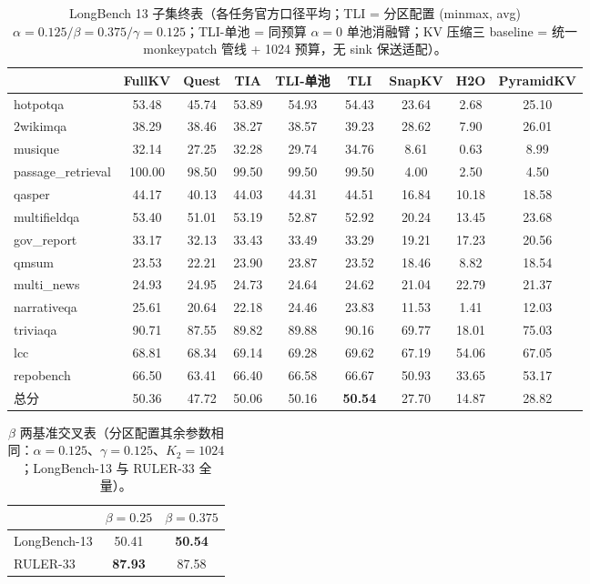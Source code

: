 \documentclass[11pt]{article}
\begin{document}
\begin{table}[h]\centering
\small
\caption{LongBench 13 子集终表（各任务官方口径平均；TLI = 分区配置 (minmax, avg) $\alpha{=}0.125/\beta{=}0.375/\gamma{=}0.125$；TLI-单池 = 同预算 $\alpha{=}0$ 单池消融臂；KV 压缩三 baseline = 统一 monkeypatch 管线 + 1024 预算，无 sink 保送适配）。}
\label{tab:longbench}
\begin{tabular}{lcccccccc}
\toprule
 & FullKV & Quest & TIA & TLI-单池 & TLI & SnapKV & H2O & PyramidKV \\

\midrule
hotpotqa & 53.48 & 45.74 & 53.89 & 54.93 & 54.43 & 23.64 & 2.68 & 25.10 \\
2wikimqa & 38.29 & 38.46 & 38.27 & 38.57 & 39.23 & 28.62 & 7.90 & 26.01 \\
musique & 32.14 & 27.25 & 32.28 & 29.74 & 34.76 & 8.61 & 0.63 & 8.99 \\
passage\_retrieval & 100.00 & 98.50 & 99.50 & 99.50 & 99.50 & 4.00 & 2.50 & 4.50 \\
qasper & 44.17 & 40.13 & 44.03 & 44.31 & 44.51 & 16.84 & 10.18 & 18.58 \\
multifieldqa & 53.40 & 51.01 & 53.19 & 52.87 & 52.92 & 20.24 & 13.45 & 23.68 \\
gov\_report & 33.17 & 32.13 & 33.43 & 33.49 & 33.29 & 19.21 & 17.23 & 20.56 \\
qmsum & 23.53 & 22.21 & 23.90 & 23.87 & 23.52 & 18.46 & 8.82 & 18.54 \\
multi\_news & 24.93 & 24.95 & 24.73 & 24.64 & 24.62 & 21.04 & 22.79 & 21.37 \\
narrativeqa & 25.61 & 20.64 & 22.18 & 24.46 & 23.83 & 11.53 & 1.41 & 12.03 \\
triviaqa & 90.71 & 87.55 & 89.82 & 89.88 & 90.16 & 69.77 & 18.01 & 75.03 \\
lcc & 68.81 & 68.34 & 69.14 & 69.28 & 69.62 & 67.19 & 54.06 & 67.05 \\
repobench & 66.50 & 63.41 & 66.40 & 66.58 & 66.67 & 50.93 & 33.65 & 53.17 \\
总分 & 50.36 & 47.72 & 50.06 & 50.16 & \textbf{50.54} & 27.70 & 14.87 & 28.82 \\
\bottomrule
\end{tabular}
\end{table}

\begin{table}[h]\centering
\caption{$\beta$ 两基准交叉表（分区配置其余参数相同：$\alpha{=}0.125$、$\gamma{=}0.125$、$K_2{=}1024$；LongBench-13 与 RULER-33 全量）。}
\label{tab:betacross}
\begin{tabular}{lcc}
\toprule
 & $\beta{=}0.25$ & $\beta{=}0.375$ \\
\midrule
LongBench-13 & 50.41 & \textbf{50.54} \\
RULER-33 & \textbf{87.93} & 87.58 \\
\bottomrule
\end{tabular}
\end{table}
\end{document}
